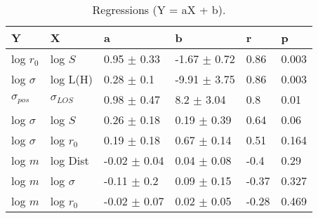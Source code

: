 \begin{table}
\centering
\caption{Regressions (Y = aX + b).}
\begin{tabular}{llllll}
\toprule
              Y &               X &                 a &                 b &      r &      p \\
\midrule
      log $r_0$ &         log $S$ &   0.95 $\pm$ 0.33 &  -1.67 $\pm$ 0.72 &   0.86 &  0.003 \\
   log $\sigma$ &        log L(H) &    0.28 $\pm$ 0.1 &  -9.91 $\pm$ 3.75 &   0.86 &  0.003 \\
 $\sigma_{pos}$ &  $\sigma_{LOS}$ &   0.98 $\pm$ 0.47 &    8.2 $\pm$ 3.04 &    0.8 &   0.01 \\
   log $\sigma$ &         log $S$ &   0.26 $\pm$ 0.18 &   0.19 $\pm$ 0.39 &   0.64 &   0.06 \\
   log $\sigma$ &     log $r_{0}$ &   0.19 $\pm$ 0.18 &   0.67 $\pm$ 0.14 &   0.51 &  0.164 \\
        log $m$ &        log Dist &  -0.02 $\pm$ 0.04 &   0.04 $\pm$ 0.08 &   -0.4 &   0.29 \\
        log $m$ &    log $\sigma$ &   -0.11 $\pm$ 0.2 &   0.09 $\pm$ 0.15 &  -0.37 &  0.327 \\
        log $m$ &     log $r_{0}$ &  -0.02 $\pm$ 0.07 &   0.02 $\pm$ 0.05 &  -0.28 &  0.469 \\
\bottomrule
\end{tabular}
\end{table}
